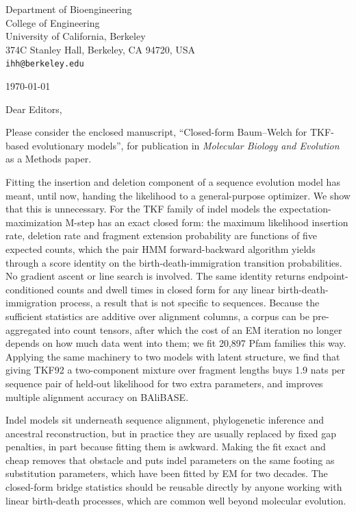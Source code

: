 \documentclass[11pt]{article}
\begin{document}
{\small
Department of Bioengineering\\
College of Engineering\\
University of California, Berkeley\\
374C Stanley Hall, Berkeley, CA 94720, USA\\
\texttt{ihh@berkeley.edu}
}

\hfill\today

Dear Editors,

Please consider the enclosed manuscript, ``Closed-form Baum--Welch for
TKF-based evolutionary models'', for publication in \emph{Molecular Biology and
Evolution} as a Methods paper.

Fitting the insertion and deletion component of a sequence evolution model has
meant, until now, handing the likelihood to a general-purpose optimizer. We
show that this is unnecessary. For the TKF family of indel models the
expectation-maximization M-step has an exact closed form: the maximum
likelihood insertion rate, deletion rate and fragment extension probability are
functions of five expected counts, which the pair HMM forward-backward
algorithm yields through a score identity on the birth-death-immigration
transition probabilities. No gradient ascent or line search is involved. The
same identity returns endpoint-conditioned counts and dwell times in closed
form for any linear birth-death-immigration process, a result that is not
specific to sequences. Because the sufficient statistics are additive over
alignment columns, a corpus can be pre-aggregated into count tensors, after
which the cost of an EM iteration no longer depends on how much data went into
them; we fit 20,897 Pfam families this way. Applying the same machinery to two
models with latent structure, we find that giving TKF92 a two-component mixture
over fragment lengths buys 1.9 nats per sequence pair of held-out likelihood
for two extra parameters, and improves multiple alignment accuracy on BAliBASE.

Indel models sit underneath sequence alignment, phylogenetic inference and
ancestral reconstruction, but in practice they are usually replaced by fixed
gap penalties, in part because fitting them is awkward. Making the fit exact
and cheap removes that obstacle and puts indel parameters on the same footing
as substitution parameters, which have been fitted by EM for two decades. The
closed-form bridge statistics should be reusable directly by anyone working
with linear birth-death processes, which are common well beyond molecular
evolution.
\end{document}
